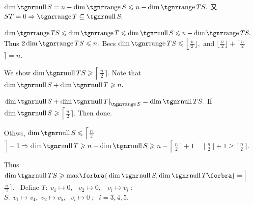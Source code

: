\Or $\dim\null S=n-\dim\range S\leqslant n-\dim\range TS.$ \;又 $ST=0\Rightarrow\range T\subseteq\null S.$\par\quad
$\dim\range TS\leqslant\dim\range T\leqslant\dim\null S\leqslant n-\dim\range TS.$ \;Thus \;$2\dim\range TS\leqslant n.$\PfEnd\vspace{5pt}\quad
\Or Becs $\dim\range TS\leqslant\Big\lfloor${\Large$\frac{\,n\,}{2}$}$\Big\rfloor,$ and $\Big\lfloor${\Large$\frac{\,n\,}{2}$}$\Big\rfloor+\Big\lceil${\Large$\frac{\,n\,}{2}$}$\Big\rceil=n.$\par\vspace{1pt}\quad
We show $\dim\null TS\geqslant\Big\lceil${\Large$\frac{\,n\,}{2}$}$\Big\rceil.$ Note that $\dim\null S+\dim\null T\geqslant n.$\par\quad
$\dim\null S+\dim\null T\mmid_{\range S}=\dim\null TS.$ \;If $\dim\null S\geqslant\Big\lceil${\Large$\frac{\,n\,}{2}$}$\Big\rceil.$ Then done.\par\vspace{1pt}\quad
Othws, $\dim\null S\leqslant\Big\lceil${\Large$\frac{\,n\,}{2}$}$\Big\rceil-1\Rightarrow\dim\null T\geqslant n-\dim\null S\geqslant n-\Big\lceil${\Large$\frac{\,n\,}{2}$}$\Big\rceil+1=\Big\lfloor${\Large$\frac{\,n\,}{2}$}$\Big\rfloor+1\geqslant\Big\lceil${\Large$\frac{\,n\,}{2}$}$\Big\rceil.$\par\vspace{2pt}\quad
Thus $\dim\null TS\geqslant\max\!\Bra{\dim\null S,\dim\null T}=\Big\lceil${\Large$\frac{\,n\,}{2}$}$\Big\rceil.$\PfEnd\vspace{4pt}\quad
\Example \,\,\,Define $T: \; v_1\mapsto 0, \;\;\, v_2\mapsto 0, \;\;\; v_i\mapsto v_i\;;$ \;\; $S: \; v_1\mapsto v_4, \; v_2\mapsto v_5, \;\; v_i\mapsto 0\;;\;\; i=3,4,5.$\par\vspace{-2pt}
\SepLine

